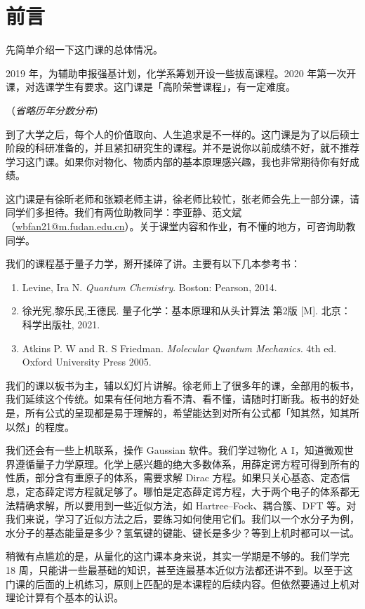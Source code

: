 \section{前言}
先简单介绍一下这门课的总体情况。


2019 年，为辅助申报强基计划，化学系筹划开设一些拔高课程。2020 年第一次开课，对选课学生有要求。这门课是「高阶荣誉课程」，有一定难度。

（\emph{省略历年分数分布}）

到了大学之后，每个人的价值取向、人生追求是不一样的。这门课是为了以后硕士阶段的科研准备的，并且紧扣研究生的课程。并不是说你以前成绩不好，就不推荐学习这门课。如果你对物化、物质内部的基本原理感兴趣，我也非常期待你有好成绩。

这门课是有徐昕老师和张颖老师主讲，徐老师比较忙，张老师会先上一部分课，请同学们多担待。我们有两位助教同学：李亚静、范文斌（\url{wbfan21@m.fudan.edu.cn}）。关于课堂内容和作业，有不懂的地方，可咨询助教同学。

我们的课程基于量子力学，掰开揉碎了讲。主要有以下几本参考书：
\begin{enumerate}
    \item  Levine, Ira N. \emph{Quantum Chemistry}. Boston: Pearson, 2014. 
    \item  徐光宪,黎乐民,王德民. 量子化学：基本原理和从头计算法 第2版 [M]. 北京：科学出版社, 2021. 
    \item  Atkins P. W and R. S Friedman. \emph{Molecular Quantum Mechanics.} 4th ed. Oxford University Press 2005.
\end{enumerate}

我们的课以板书为主，辅以幻灯片讲解。徐老师上了很多年的课，全部用的板书，我们延续这个传统。如果有任何地方看不清、看不懂，请随时打断我。板书的好处是，所有公式的呈现都是易于理解的，希望能达到对所有公式都「知其然，知其所以然」的程度。

我们还会有一些上机联系，操作 Gaussian 软件。我们学过物化 A I，知道微观世界遵循量子力学原理。化学上感兴趣的绝大多数体系，用薛定谔方程可得到所有的性质，部分含有重原子的体系，需要求解 Dirac 方程。如果只关心基态、定态信息，定态薛定谔方程就足够了。哪怕是定态薛定谔方程，大于两个电子的体系都无法精确求解，所以要用到一些近似方法，如 Hartree--Fock、耦合簇、DFT 等。对我们来说，学习了近似方法之后，要练习如何使用它们。我们以一个水分子为例，水分子的基态能量是多少？氢氧键的键能、键长是多少？等到上机时都可以一试。

稍微有点尴尬的是，从量化的这门课本身来说，其实一学期是不够的。我们学完 18 周，只能讲一些最基础的知识，甚至连最基本近似方法都还讲不到。以至于这门课的后面的上机练习，原则上匹配的是本课程的后续内容。但依然要通过上机对理论计算有个基本的认识。

